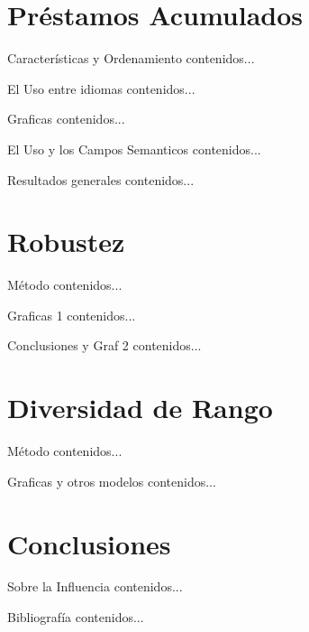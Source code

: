 \documentclass[10pt]{beamer}
\begin{document}
\section{Préstamos Acumulados}

\begin{frame}[fragile]{Características y Ordenamiento}
	contenidos...
\end{frame}

\begin{frame}[fragile]{El Uso entre idiomas}
	contenidos...
\end{frame}

\begin{frame}[fragile]{Graficas}
	contenidos...
\end{frame}

\begin{frame}[fragile]{El Uso y los Campos Semanticos}
	contenidos...
\end{frame}

\begin{frame}{Resultados generales}
	contenidos...
\end{frame}


\section{Robustez}

\begin{frame}[fragile]{Método}
	contenidos...
\end{frame}

\begin{frame}[fragile]{Graficas 1}
	contenidos...
\end{frame}

\begin{frame}[fragile]{Conclusiones y Graf 2}
	contenidos...
\end{frame}

\section{Diversidad de Rango}

\begin{frame}[fragile]{Método}
	contenidos...
\end{frame}

\begin{frame}{Graficas y otros modelos}
	contenidos...
\end{frame}


\section{Conclusiones}

\begin{frame}[fragile]{Sobre la Influencia}
	contenidos...
\end{frame}

\begin{frame}[fragile]{Bibliografía}
	contenidos...
\end{frame}
\end{document}
